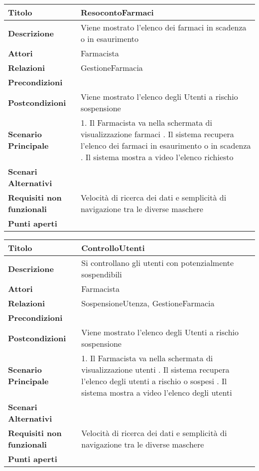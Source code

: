 \begin{tabular} {|P{4.5cm}|P{12.5cm}|}
  \hline
    \textbf{Titolo} & ResocontoFarmaci\\
  \hline
    \textbf{Descrizione} & Viene mostrato l'elenco dei farmaci in scadenza o in esaurimento\\
  \hline
    \textbf{Attori} & Farmacista\\
  \hline
    \textbf{Relazioni} & GestioneFarmacia\\
  \hline
    \textbf{Precondizioni} &\\
  \hline
    \textbf{Postcondizioni} & Viene mostrato l'elenco degli Utenti a rischio sospensione\\
  \hline
    \textbf{Scenario Principale} & 1. Il Farmacista va nella schermata di visualizzazione farmaci . Il sistema recupera l'elenco dei farmaci in esaurimento o in scadenza . Il sistema mostra a video l'elenco richiesto\\
  \hline
    \textbf{Scenari Alternativi} &\\
  \hline
    \textbf{Requisiti non funzionali} & Velocità di ricerca dei dati e semplicità di navigazione tra le diverse maschere\\
  \hline
    \textbf{Punti aperti} &\\
  \hline
\end{tabular}
\hfill
\break

\begin{tabular} {|P{4.5cm}|P{12.5cm}|}
\hline
  \textbf{Titolo} & ControlloUtenti\\
\hline
  \textbf{Descrizione} & Si controllano gli utenti con potenzialmente sospendibili\\
\hline
  \textbf{Attori} & Farmacista\\
\hline
  \textbf{Relazioni} & SospensioneUtenza, GestioneFarmacia\\
\hline
  \textbf{Precondizioni} &\\
\hline
  \textbf{Postcondizioni} & Viene mostrato l'elenco degli Utenti a rischio sospensione\\
\hline
  \textbf{Scenario Principale} & 1. Il Farmacista va nella schermata di visualizzazione utenti . Il sistema recupera l'elenco degli utenti a rischio o sospesi . Il sistema mostra a video l'elenco degli utenti\\
\hline
  \textbf{Scenari Alternativi} &\\
\hline
  \textbf{Requisiti non funzionali} & Velocità di ricerca dei dati e semplicità di navigazione tra le diverse maschere\\
\hline
  \textbf{Punti aperti} & \\
\hline
\end{tabular}
\hfill
\break

